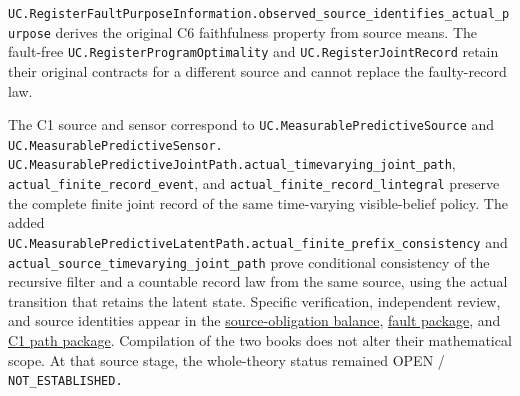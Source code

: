\documentclass[
  english,
  11pt,
  oneside]{book}
\begin{document}
\nolinkurl{UC.RegisterFaultPurposeInformation.observed_source_identifies_actual_purpose} derives the original C6 faithfulness property from source means. The fault-free \nolinkurl{UC.RegisterProgramOptimality} and \nolinkurl{UC.RegisterJointRecord} retain their original contracts for a different source and cannot replace the faulty-record law.

The C1 source and sensor correspond to \nolinkurl{UC.MeasurablePredictiveSource} and \nolinkurl{UC.MeasurablePredictiveSensor.} \nolinkurl{UC.MeasurablePredictiveJointPath.actual_timevarying_joint_path}, \nolinkurl{actual_finite_record_event}, and \nolinkurl{actual_finite_record_lintegral} preserve the complete finite joint record of the same time-varying visible-belief policy. The added \nolinkurl{UC.MeasurablePredictiveLatentPath.actual_finite_prefix_consistency} and \nolinkurl{actual_source_timevarying_joint_path} prove conditional consistency of the recursive filter and a countable record law from the same source, using the actual transition that retains the latent state. Specific verification, independent review, and source identities appear in the \href{../formalization/ueot-core/docs/compression/theory_completion/unified_closure/actual_infinite_sources_v1/RESULTS_AND_OPEN_OBLIGATIONS.md}{source-obligation balance}, \href{../formalization/ueot-core/docs/compression/theory_completion/unified_closure/register_fault_resources_v1/RESULTS_AND_OPEN_OBLIGATIONS.md}{fault package}, and \href{../formalization/ueot-core/docs/compression/theory_completion/unified_closure/c1_joint_path_v1/RESULTS_AND_OPEN_OBLIGATIONS.md}{C1 path package}. Compilation of the two books does not alter their mathematical scope. At that source stage, the whole-theory status remained OPEN / \nolinkurl{NOT_ESTABLISHED.}
\end{document}
